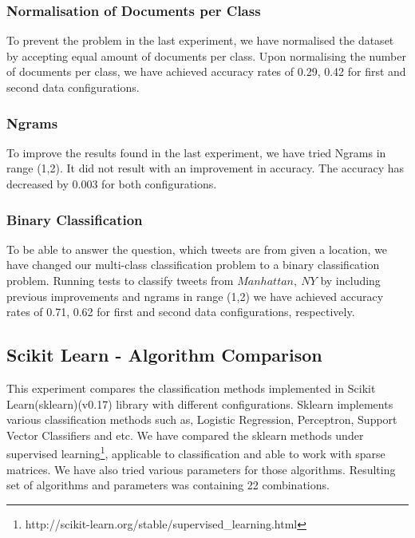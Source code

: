 \documentclass[twoside,11pt]{article}
\begin{document}
\subsubsection{Normalisation of Documents per Class}
To prevent the problem in the last experiment, we have normalised the dataset by accepting equal amount of documents per class. Upon normalising the number of documents per class, we have achieved accuracy rates of 0.29, 0.42 for first and second data configurations.

\subsubsection{Ngrams}
To improve the results found in the last experiment, we have tried Ngrams in range (1,2). It did not result with an improvement in accuracy. The accuracy has decreased by 0.003 for both configurations.

\subsubsection{Binary Classification}
To be able to answer the question, which tweets are from given a location, we have changed our multi-class classification problem to a binary classification problem. Running tests to classify tweets from $Manhattan,\ NY$ by including previous improvements and ngrams in range (1,2) we have achieved accuracy rates of 0.71, 0.62 for first and second data configurations, respectively. 

\subsection{Scikit Learn - Algorithm Comparison}
This experiment compares the classification methods implemented in Scikit Learn(sklearn)(v0.17) library with different configurations. Sklearn implements various classification methods such as, Logistic Regression, Perceptron, Support Vector Classifiers and etc. We have compared the sklearn methods under supervised learning\footnote{http://scikit-learn.org/stable/supervised\_learning.html}, applicable to classification and able to work with sparse matrices. We have also tried various parameters for those algorithms. Resulting set of algorithms and parameters was containing 22 combinations.
\end{document}
